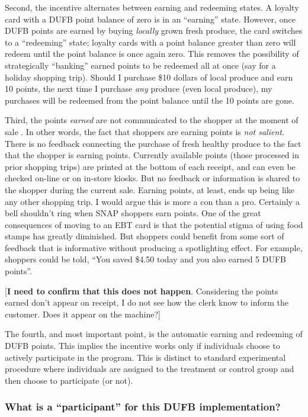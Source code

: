 \documentclass[12pt,letterpaperpaper,]{book}
\begin{document}
Second, the incentive alternates between earning and redeeming states. A
loyalty card with a DUFB point balance of zero is in an ``earning''
state. However, once DUFB points are earned by buying \emph{locally}
grown fresh produce, the card switches to a ``redeeming'' state; loyalty
cards with a point balance greater than zero will redeem until the point
balance is once again zero. This removes the possibility of
strategically ``banking'' earned points to be redeemed all at once (say
for a holiday shopping trip). Should I purchase \$10 dollars of local
produce and earn 10 points, the next time I purchase \emph{any} produce
(even local produce), my purchases will be redeemed from the point
balance until the 10 points are gone.

Third, the points \emph{earned} are not communicated to the shopper at
the moment of sale \citep{family_fare_double_2016}. In other words, the
fact that shoppers are earning points is \emph{not salient}. There is no
feedback connecting the purchase of fresh healthy produce to the fact
that the shopper is earning points. Currently available points (those
processed in prior shopping trips) are printed at the bottom of each
receipt, and can even be checked on-line or on in-store kiosks. But no
feedback or information is shared to the shopper during the current
sale. Earning points, at least, ends up being like any other shopping
trip. I would argue this is more a con than a pro. Certainly a bell
shouldn't ring when SNAP shoppers earn points. One of the great
consequences of moving to an EBT card is that the potential stigma of
using food stamps has greatly diminished. But shoppers could benefit
from some sort of feedback that is informative without producing a
spotlighting effect. For example, shoppers could be told, ``You saved
\$4.50 today and you also earned 5 DUFB points''.

{[}\textbf{I need to confirm that this does not happen}. Considering the
points earned don't appear on receipt, I do not see how the clerk know
to inform the customer. Does it appear on the machine?{]}

The fourth, and most important point, is the automatic earning and
redeeming of DUFB points. This implies the incentive works only if
individuals choose to actively participate in the program. This is
distinct to standard experimental procedure where individuals are
assigned to the treatment or control group and then choose to
participate (or not).

\subsubsection*{\texorpdfstring{What is a ``participant'' for this DUFB
implementation?}{What is a participant for this DUFB implementation?}}\label{what-is-a-participant-for-this-dufb-implementation}
\end{document}
